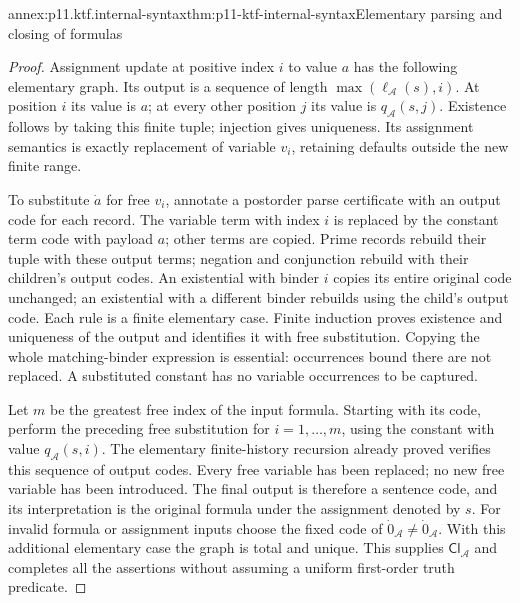 \begin{annexitem}{annex:p11.ktf.internal-syntax}{thm:p11-ktf-internal-syntax}{Elementary parsing and closing of formulas}
\begin{proof}
Assignment update at positive index \(i\) to value \(a\)
has the following elementary graph. Its output is a sequence of
length \(\max(\ell_{\mathcal A}(s),i)\). At position \(i\)
its value is \(a\); at every other position \(j\) its value
is \(q_{\mathcal A}(s,j)\). Existence follows by taking
this finite tuple; injection gives uniqueness. Its assignment semantics
is exactly replacement of variable \(v_i\), retaining defaults
outside the new finite range.

To substitute \(\dot a\) for free \(v_i\), annotate a
postorder parse certificate with an output code for each record.
The variable term with index \(i\) is replaced by the constant
term code with payload \(a\); other terms are copied. Prime
records rebuild their tuple with these output terms; negation and
conjunction rebuild with their children's output codes. An existential
with binder \(i\) copies its entire original code unchanged;
an existential with a different binder rebuilds using the child's
output code. Each rule is a finite elementary case. Finite induction
proves existence and uniqueness of the output and identifies it
with free substitution. Copying the whole matching-binder expression
is essential: occurrences bound there are not replaced. A substituted
constant has no variable occurrences to be captured.

Let \(m\) be the greatest free index of the input formula.
Starting with its code, perform the preceding free substitution for
\(i=1,\ldots,m\), using the constant with value
\(q_{\mathcal A}(s,i)\). The elementary finite-history recursion
already proved verifies this sequence of output codes. Every free
variable has been replaced; no new free variable has been introduced.
The final output is therefore a sentence code, and its interpretation
is the original formula under the assignment denoted by \(s\).
For invalid formula or assignment inputs choose the fixed code of
\(\dot 0_{\mathcal A}\ne\dot 0_{\mathcal A}\).
With this additional elementary case the graph is total and unique.
This supplies \(\mathsf{Cl}_{\mathcal A}\) and completes all
the assertions without assuming a uniform first-order truth predicate.
\end{proof}
\end{annexitem}

